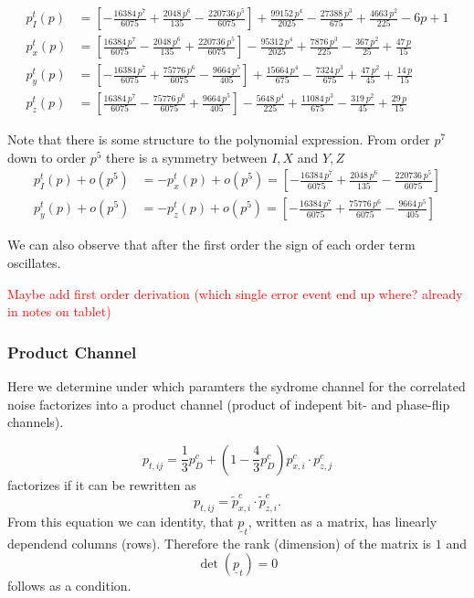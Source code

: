 \begin{align*}
p_{I}^t(p) &= \left[-\frac{16384\,p^7}{6075} + \frac{2048\,p^6}{135} - \frac{220736\,p^5}{6075}\right] + \frac{99152\,p^4}{2025} - \frac{27388\,p^3}{675} + \frac{4663\,p^2}{225} - 6p + 1 \\
p_{x}^t(p) &= \left[\frac{16384\,p^7}{6075} - \frac{2048\,p^6}{135} + \frac{220736\,p^5}{6075}\right] - \frac{95312\,p^4}{2025} + \frac{7876\,p^3}{225} - \frac{367\,p^2}{25} + \frac{47\,p}{15} \\
p_{y}^t(p) &= \left[-\frac{16384\,p^7}{6075} + \frac{75776\,p^6}{6075} - \frac{9664\,p^5}{405}\right] + \frac{15664\,p^4}{675} - \frac{7324\,p^3}{675} + \frac{47\,p^2}{45} + \frac{14\,p}{15} \\
p_{z}^t(p) &= \left[\frac{16384\,p^7}{6075} - \frac{75776\,p^6}{6075} + \frac{9664\,p^5}{405}\right] - \frac{5648\,p^4}{225} + \frac{11084\,p^3}{675} - \frac{319\,p^2}{45} + \frac{29\,p}{15} 
\end{align*}

Note that there is some structure to the polynomial expression. 
From order $p^7$ down to order $p^5$ there is a symmetry between $I,X$ and $Y,Z$
\begin{align*}
    p_I^t(p) + o(p^5) &= -p_x^t(p) + o(p^5) = \left[-\frac{16384\,p^7}{6075} + \frac{2048\,p^6}{135} - \frac{220736\,p^5}{6075}\right] \\
    p_y^t(p) + o(p^5) &= -p_z^t(p) + o(p^5) = \left[-\frac{16384\,p^7}{6075} + \frac{75776\,p^6}{6075} - \frac{9664\,p^5}{405}\right]
\end{align*} 

We can also observe that after the first order the sign of each order term oscillates.

\textcolor{red}{Maybe add first order derivation (which single error event end up where? already in notes on tablet)}


\subsubsection{Product Channel}

Here we determine under which paramters the sydrome channel for the correlated noise factorizes into a product channel (product of indepent bit- and phase-flip channels).

\begin{equation}
    p_{t,ij} = \frac{1}{3} p_D^c + \left( 1- \frac{4}{3} p_D^c \right) p_{x,i}^c \cdot p_{z,j}^c 
\end{equation}
factorizes if it can be rewritten as 
\begin{equation}
    p_{t,ij} = \tilde{p}_{x,i}^c \cdot \tilde{p}_{z,i}^c. 
\end{equation}
From this equation we can identity, that $\underline{p}_t$, written as a matrix, has linearly dependend columns (rows).
Therefore the rank (dimension) of the matrix is $1$ and
\begin{equation}
    \det(\underline{p}_t) = 0
\end{equation}
follows as a condition.

